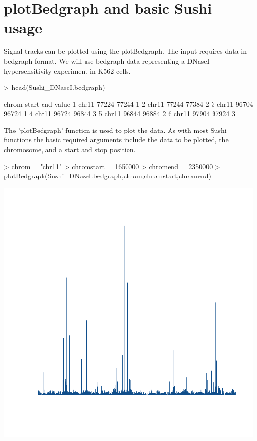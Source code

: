 \documentclass{article}
\begin{document}
\section{plotBedgraph and basic Sushi usage}

Signal tracks can be plotted using the plotBedgraph.  The input requires data in bedgraph format.  We will use bedgraph data representing a DNaseI hypersensitivity experiment in K562 cells.

\begin{Schunk}
\begin{Sinput}
>   head(Sushi_DNaseI.bedgraph)
\end{Sinput}
\begin{Soutput}
  chrom start   end value
1 chr11 77224 77244     1
2 chr11 77244 77384     2
3 chr11 96704 96724     1
4 chr11 96724 96844     3
5 chr11 96844 96884     2
6 chr11 97904 97924     3
\end{Soutput}
\end{Schunk}

The 'plotBedgraph' function is used to plot the data.  As with most Sushi functions the basic required arguments include the data to be plotted, the chromosome, and a start and stop position.


\begin{center}

\begin{Schunk}
\begin{Sinput}
> chrom            = "chr11"
> chromstart       = 1650000
> chromend         = 2350000
> plotBedgraph(Sushi_DNaseI.bedgraph,chrom,chromstart,chromend)
\end{Sinput}
\end{Schunk}
\includegraphics{Sushi-005}
\end{center}
\end{document}

